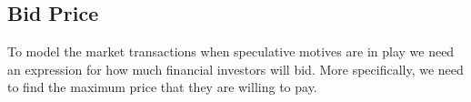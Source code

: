 







\subsection{Bid Price}
To model the market transactions when speculative motives are in play we need an expression for how much financial investors will bid. More specifically, we need to find the maximum price that they are willing to pay. 


